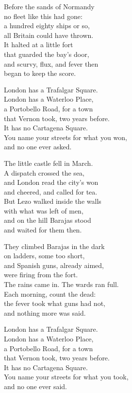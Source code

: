 \begin{lyrics}
Before the sands of Normandy\\
no fleet like this had gone:\\
a hundred eighty ships or so,\\
all Britain could have thrown.\\
It halted at a little fort\\
that guarded the bay's door,\\
and scurvy, flux, and fever then\\
began to keep the score.

London has a Trafalgar Square.\\
London has a Waterloo Place,\\
a Portobello Road, for a town\\
that Vernon took, two years before.\\
It has no Cartagena Square.\\
You name your streets for what you won,\\
and no one ever asked.

The little castle fell in March.\\
A dispatch crossed the sea,\\
and London read the city's won\\
and cheered, and called for tea.\\
But Lezo walked inside the walls\\
with what was left of men,\\
and on the hill Barajas stood\\
and waited for them then.

They climbed Barajas in the dark\\
on ladders, some too short,\\
and Spanish guns, already aimed,\\
were firing from the fort.\\
The rains came in. The wards ran full.\\
Each morning, count the dead:\\
the fever took what guns had not,\\
and nothing more was said.

London has a Trafalgar Square.\\
London has a Waterloo Place,\\
a Portobello Road, for a town\\
that Vernon took, two years before.\\
It has no Cartagena Square.\\
You name your streets for what you took,\\
and no one ever said.


\end{lyrics}
